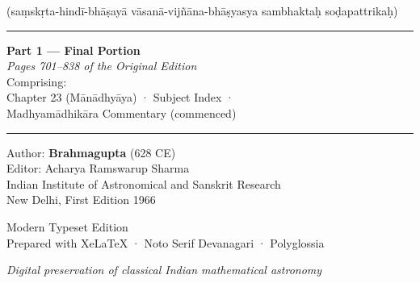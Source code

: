 \documentclass[11pt,a4paper]{article}
\newcommand{\longline}{\noindent\rule{\textwidth}{0.4pt}}
\newcommand{\dev}[1]{{\devanagarifont #1}}
\begin{document}
\thispagestyle{empty}
\begin{center}
\vspace*{2cm}

{\fontsize{14}{16}\selectfont\dev{श्रीब्रह्मगुप्ताचार्य-विरचित}}

\vspace{0.8cm}

{\fontsize{28}{34}\selectfont\dev{ब्राह्मस्फुटसिद्धान्तः}}

\vspace{1.5cm}

{\Large (\textsanskrit{saṃskṛta-hindī-bhāṣayā vāsanā-vijñāna-bhāṣyasya sambhaktaḥ soḍapattrikaḥ})}

\vspace{2cm}

\longline

\vspace{0.8cm}

{\LARGE\textbf{Part 1 --- Final Portion}}\\[0.5cm]
{\large\textit{Pages 701--838 of the Original Edition}}\\[0.3cm]
{\small Comprising:}\\[0.2cm]
{\normalsize Chapter 23 (Mānādhyāya) · Subject Index ·}\\[0.1cm]
{\normalsize Madhyamādhikāra Commentary (commenced)}

\vspace{0.8cm}

\longline

\vspace{1.5cm}

{\large Author: \textbf{Brahmagupta} (628 CE)}\\[0.3cm]
{\normalsize Editor: Acharya Ramswarup Sharma}\\[0.1cm]
{\small Indian Institute of Astronomical and Sanskrit Research}\\[0.1cm]
{\small New Delhi, First Edition 1966}

\vspace{2cm}

{\small Modern Typeset Edition}\\[0.2cm]
{\footnotesize Prepared with XeLaTeX · Noto Serif Devanagari · Polyglossia}

\vfill
{\textit{Digital preservation of classical Indian mathematical astronomy}}

\end{center}
\newpage
\end{document}
